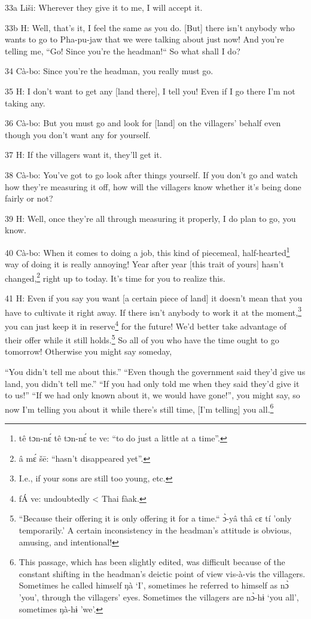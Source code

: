 33a Liši: Wherever they give it to me, I will accept it.

33b H: Well, that's it, I feel the same as you do. [But] there isn't anybody who
wants to go to Pha-pu-jaw that we were talking about just now! And you're telling
me, ``Go! Since you're the headman!`` So what shall I do?

34 Cà-bo: Since you're the headman, you really must go.

35 H: I don't want to get any [land there], I tell you! Even if I go there I'm
not taking any.

36 Cà-bo: But you must go and look for [land] on the villagers' behalf even though
you don't want any for yourself.

37 H: If the villagers want it, they'll get it.

38 Cà-bo: You've got to go look after things yourself. If you don't go and watch
how they're measuring it off, how will the villagers know whether it's being done
fairly or not?

39 H: Well, once they're all through measuring it properly, I do plan to go, you
know.

40 Cà-bo: When it comes to doing a job, this kind of piecemeal, half-hearted\footnote{tê tɔn-nɛ́ tê tɔn-nɛ́ te ve: ``to do just a little at a time''.}
way of doing it is really annoying! Year after year [this trait of yours] hasn't
changed,\footnote{â mɛ́ šē: ``hasn't disappeared yet''.} right up to today. It's time for you to realize this.

41 H: Even if you say you want [a certain piece of land] it doesn't mean that you
have to cultivate it right away. If there isn't anybody to work it at the moment,\footnote{I.e., if your sons are still too young, etc.}
you can just keep it in reserve\footnote{fÁ ve: undoubtedly < Thai fàak.} for the future! We'd better take advantage
of their offer while it still holds.\footnote{``Because their offering it is only offering it for a time.`` ɔ̀-yâ thâ cɛ tí 'only temporarily.' A certain inconsistency in the headman's attitude is obvious, amusing, and intentional!} So all of you who have the time ought
to go tomorrow! Otherwise you might say someday,

``You didn't tell me about this.'' ``Even though the government said they'd give
us land, you didn't tell me.'' ``If you had only told me when they said they'd
give it to us!'' ``If we had only known about it, we would have gone!'', you might
say, so now I'm telling you about it while there's still time, [I'm telling] you
all.\footnote{This passage, which has been slightly edited, was difficult because of the constant shifting in the headman's deictic point of view vis-à-vis the villagers. Sometimes he called himself ŋà `I', sometimes he referred to himself as nɔ̀ 'you', through the villagers' eyes. Sometimes the villagers are nɔ̀-hɨ `you all', sometimes ŋà-hɨ 'we'.}


